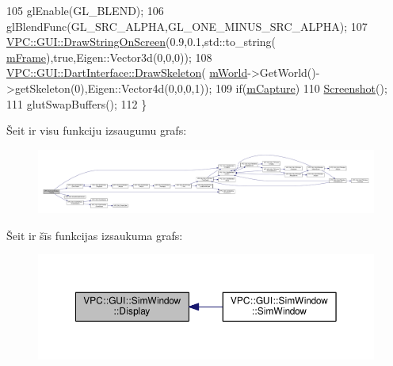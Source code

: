 \begin{DoxyCode}
105     glEnable(GL\_BLEND);
106     glBlendFunc(GL\_SRC\_ALPHA,GL\_ONE\_MINUS\_SRC\_ALPHA);
107     \hyperlink{namespace_v_p_c_1_1_g_u_i_aba7cda15c9d9fa148f09e44915ec78f9}{VPC::GUI::DrawStringOnScreen}(0.9,0.1,std::to\_string(
      \hyperlink{class_v_p_c_1_1_g_u_i_1_1_sim_window_a639a2dd01463388074a24d18d6144832}{mFrame}),\textcolor{keyword}{true},Eigen::Vector3d(0,0,0));
108     \hyperlink{namespace_v_p_c_1_1_g_u_i_1_1_dart_interface_a0f48bc6711d69c0979519f00998d1876}{VPC::GUI::DartInterface::DrawSkeleton}(
      \hyperlink{class_v_p_c_1_1_g_u_i_1_1_sim_window_a8a2dc03c2b159164e3a1d27e6de8774d}{mWorld}->GetWorld()->getSkeleton(0),Eigen::Vector4d(0,0,0,1));
109     \textcolor{keywordflow}{if}(\hyperlink{class_v_p_c_1_1_g_u_i_1_1_sim_window_aba16bb9ad6a9ad532b1c5e5e0951953d}{mCapture})
110         \hyperlink{class_v_p_c_1_1_g_u_i_1_1_sim_window_ac609ccaf459a941709927da1e36403e8}{Screenshot}();
111     glutSwapBuffers();
112 \}
\end{DoxyCode}


Šeit ir visu funkciju izsaugumu grafs\+:
\nopagebreak
\begin{figure}[H]
\begin{center}
\leavevmode
\includegraphics[width=350pt]{class_v_p_c_1_1_g_u_i_1_1_sim_window_a6863fa1bec1696c6984c2f1066428e21_cgraph}
\end{center}
\end{figure}




Šeit ir šīs funkcijas izsaukuma grafs\+:
\nopagebreak
\begin{figure}[H]
\begin{center}
\leavevmode
\includegraphics[width=350pt]{class_v_p_c_1_1_g_u_i_1_1_sim_window_a6863fa1bec1696c6984c2f1066428e21_icgraph}
\end{center}
\end{figure}



